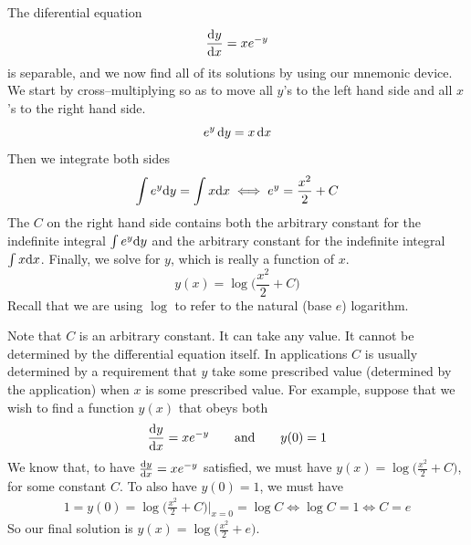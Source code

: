 \begin{eg}\label{eg:SDEsdeAA}
The diferential equation
\begin{equation*}
\diff{y}{x} = xe^{-y}
\end{equation*}
is separable, and we now find all of its solutions by using our mnemonic
device. We start by cross--multiplying so as to move all $y$'s to the left
hand side and all $x$'s to the right hand side.
\begin{equation*}
e^y\,\mathrm{d}y = x\,\mathrm{d}x
\end{equation*}
Then we integrate both sides
\begin{equation*}
\int e^y\mathrm{d}y = \int x\mathrm{d}x
\iff e^y = \frac{x^2}{2}+C
\end{equation*}
The $C$ on the right hand side contains both the arbitrary constant
for the indefinite integral $\int e^y\mathrm{d}y$ and the arbitrary constant for
the indefinite integral  $\int x\mathrm{d}x$. Finally, we solve for $y$,
which is really a function of $x$.
\begin{equation*}
y(x) = \log\Big(\frac{x^2}{2}+C\Big)
\end{equation*}
Recall that we are using $\log$ to refer to the natural (base $e$)
logarithm.

Note that $C$ is an arbitrary constant. It can take any value. It cannot be
determined by the differential equation itself. In applications $C$ is usually
determined by a requirement that $y$ take some prescribed value (determined by the  application) when $x$ is some prescribed value. For example, suppose that we wish to find a function $y(x)$ that obeys both
\begin{equation*}
\diff{y}{x} = xe^{-y}\qquad\text{and}\qquad y(0)=1
\end{equation*}
We know that, to have $\diff{y}{x} = xe^{-y}$ satisfied, we must have
$y(x) = \log\big(\frac{x^2}{2}+C\big)$, for some constant $C$. To also have
$y(0)=1$, we must have
\begin{align*}
1=y(0)=\log\Big(\frac{x^2}{2}+C\Big)\bigg|_{x=0}=\log C
\iff \log C =1
\iff C=e
\end{align*}
So our final solution is $y(x) = \log\big(\frac{x^2}{2}+e\big)$.
\end{eg}



